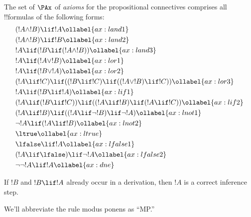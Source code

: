 \documentclass[../../../include/open-logic-section]{subfiles}
\begin{document}


\begin{defn}[Axioms]
The set of $\PAx$ of \emph{axioms} for the propositional connectives comprises
all !!{formula}s of the following forms:
\begin{align}
  & (!A \land !B) \lif !A \ollabel{ax:land1}\\
  & (!A \land !B) \lif !B \ollabel{ax:land2}\\
  & !A \lif (!B \lif (!A \land !B)) \ollabel{ax:land3}\\
  & !A \lif (!A \lor !B) \ollabel{ax:lor1}\\
  & !A \lif (!B \lor !A) \ollabel{ax:lor2}\\
  & (!A \lif !C) \lif ((!B \lif !C) \lif ((!A \lor !B) \lif !C)) \ollabel{ax:lor3}\\
  & !A \lif (!B \lif !A) \ollabel{ax:lif1}\\
  & (!A \lif (!B \lif !C)) \lif ((!A \lif !B) \lif (!A \lif !C)) \ollabel{ax:lif2}\\
  & (!A \lif !B) \lif ((!A \lif \lnot !B) \lif \lnot !A) \ollabel{ax:lnot1}\\
  & \lnot !A \lif (!A \lif !B) \ollabel{ax:lnot2}\\
  & \ltrue \ollabel{ax:ltrue}\\
  & \lfalse \lif !A \ollabel{ax:lfalse1}\\
  & (!A \lif \lfalse) \lif \lnot !A \ollabel{ax:lfalse2}\\
  & \lnot\lnot !A \lif !A \ollabel{ax:dne}
\end{align}
\end{defn}

\begin{defn}
  If $!B$ and $!B \lif !A$ already occur in a derivation, then $!A$ is
  a correct inference step.
\end{defn}

We'll abbreviate the rule modus ponens as ``MP.''
\end{document}

